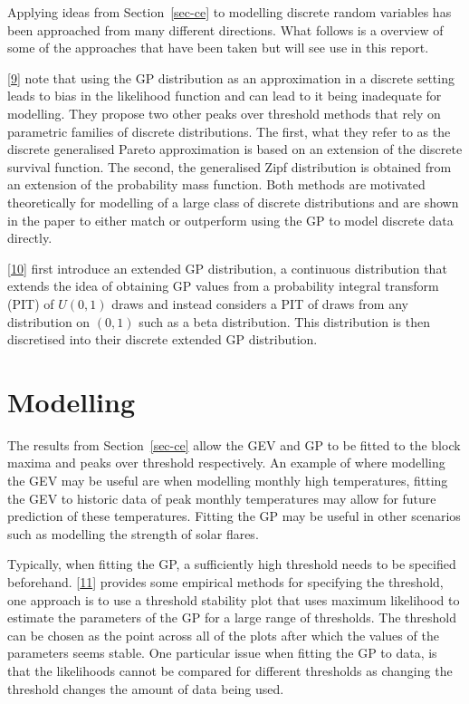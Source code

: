 \documentclass[
  10pt,
  a4paper,
]{scrreprt}
\theoremstyle{definition}
\theoremstyle{plain}
\theoremstyle{plain}
\theoremstyle{remark}
\begin{document}
{Applying ideas from Section~\ref{sec-ce} to modelling discrete random
variables has been approached from many different directions. What
follows is a overview of some of the approaches that have been taken but
will see use in this report.

{[}\protect\hyperlink{ref-hds24}{9}{]} note that using the GP
distribution as an approximation in a discrete setting leads to bias in
the likelihood function and can lead to it being inadequate for
modelling. They propose two other peaks over threshold methods that rely
on parametric families of discrete distributions. The first, what they
refer to as the discrete generalised Pareto approximation is based on an
extension of the discrete survival function. The second, the generalised
Zipf distribution is obtained from an extension of the probability mass
function. Both methods are motivated theoretically for modelling of a
large class of discrete distributions and are shown in the paper to
either match or outperform using the GP to model discrete data directly.

{[}\protect\hyperlink{ref-agn22}{10}{]} first introduce an extended GP
distribution, a continuous distribution that extends the idea of
obtaining GP values from a probability integral transform (PIT) of
\(U(0,1)\) draws and instead considers a PIT of draws from any
distribution on \((0,1)\) such as a beta distribution. This distribution
is then discretised into their discrete extended GP distribution.

\hypertarget{sec-mod}{%
\section{Modelling}\label{sec-mod}}

The results from Section~\ref{sec-ce} allow the GEV and GP to be fitted
to the block maxima and peaks over threshold respectively. An example of
where modelling the GEV may be useful are when modelling monthly high
temperatures, fitting the GEV to historic data of peak monthly
temperatures may allow for future prediction of these temperatures.
Fitting the GP may be useful in other scenarios such as modelling the
strength of solar flares.

Typically, when fitting the GP, a sufficiently high threshold needs to
be specified beforehand. {[}\protect\hyperlink{ref-coles2001}{11}{]}
provides some empirical methods for specifying the threshold, one
approach is to use a threshold stability plot that uses maximum
likelihood to estimate the parameters of the GP for a large range of
thresholds. The threshold can be chosen as the point across all of the
plots after which the values of the parameters seems stable. One
particular issue when fitting the GP to data, is that the likelihoods
cannot be compared for different thresholds as changing the threshold
changes the amount of data being used.

}
\end{document}
